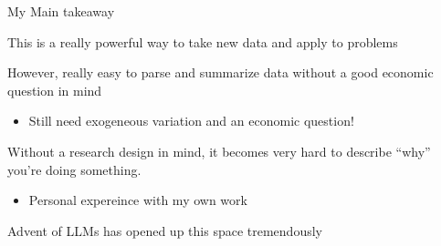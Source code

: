 \documentclass[notes,11pt, aspectratio=169]{beamer}
\newenvironment{wideitemize}{\itemize\addtolength{\itemsep}{10pt}}{\enditemize}
\begin{document}
  
  
  \begin{frame}{My Main takeaway}
    \begin{wideitemize}
    \item This is a really powerful way to take new data and apply to problems
    \item However, really easy to parse and summarize data without a good economic question in mind
      \begin{itemize}
      \item Still need exogeneous variation and an economic question!
      \end{itemize}
    \item Without a research design in mind, it becomes very hard to
      describe ``why'' you're doing something.
      \begin{itemize}
      \item Personal expereince with my own work
      \end{itemize}
    \item Advent of LLMs has opened up this space tremendously
    \end{wideitemize}
  \end{frame}
\end{document}
